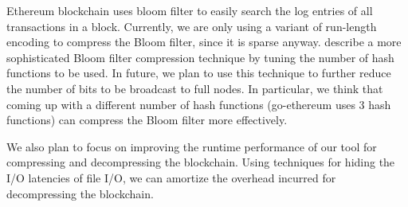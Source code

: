 Ethereum blockchain uses bloom filter to easily search the log entries of all transactions in a block.
Currently, we are only using a variant of run-length encoding to compress the Bloom filter, since it is sparse anyway. 
\citep{mitzenmacher:2001} describe a more sophisticated Bloom filter compression technique by tuning the number of hash functions to be used. 
In future, we plan to use this technique to further reduce the number of bits to be broadcast to full nodes.
In particular, we think that coming up with a different number of hash functions (go-ethereum uses 3 hash functions) can compress the Bloom filter more effectively.

We also plan to focus on improving the runtime performance of our tool for compressing and decompressing the blockchain.
Using techniques for hiding the I/O latencies of file I/O, we can amortize 
the overhead incurred for decompressing the blockchain.



